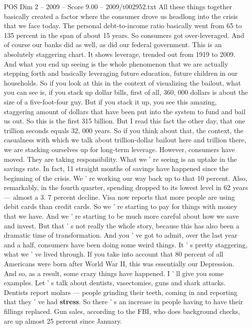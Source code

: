 \begin{textsample}{POS Dim 2 – 2009 – Score 9.00 – 2009/t002952.txt}
All these things together basically created a factor where the consumer drove us headlong into the crisis that we face today.
The personal debt-to-income ratio basically went from 65 to 135 percent in the span of about 15 years.
So consumers got over-leveraged.
And of course our banks did as well, as did our federal government.
This is an absolutely staggering chart.
It shows leverage, trended out from 1919 to 2009.
And what you end up seeing is the whole phenomenon that we are actually stepping forth and basically leveraging future education, future children in our households.
So if you look at this in the context of visualizing the bailout, what you can see is, if you stack up dollar bills, first of all, 360, 000 dollars is about the size of a five-foot-four guy.
But if you stack it up, you see this amazing, staggering amount of dollars that have been put into the system to fund and bail us out.
So this is the first 315 billion.
But I read this fact the other day, that one trillion seconds equals 32, 000 years.
So if you think about that, the context, the casualness with which we talk about trillion-dollar bailout here and trillion there, we are stacking ourselves up for long-term leverage.
However, consumers have moved.
They are taking responsibility.
What we ' re seeing is an uptake in the savings rate.
In fact, 11 straight months of savings have happened since the beginning of the crisis.
We ' re working our way back up to that 10 percent.
Also, remarkably, in the fourth quarter, spending dropped to its lowest level in 62 years — almost a 3. 7 percent decline.
Visa now reports that more people are using debit cards than credit cards.
So we ' re starting to pay for things with money that we have.
And we ' re starting to be much more careful about how we save and invest.
But that ' s not really the whole story, because this has also been a dramatic time of transformation.
And you ' ve got to admit, over the last year and a half, consumers have been doing some weird things.
It ' s pretty staggering, what we ' ve lived through.
If you take into account that 80 percent of all Americans were born after World War II, this was essentially our Depression.
And so, as a result, some crazy things have happened.
I ' ll give you some examples.
Let ' s talk about dentists, vasectomies, guns and shark attacks.
Dentists report molars — people grinding their teeth, coming in and reporting that they ' ve had \textbf{stress}.
So there ' s an increase in people having to have their fillings replaced.
Gun sales, according to the FBI, who does background checks, are up almost 25 percent since January.

\end{textsample}
